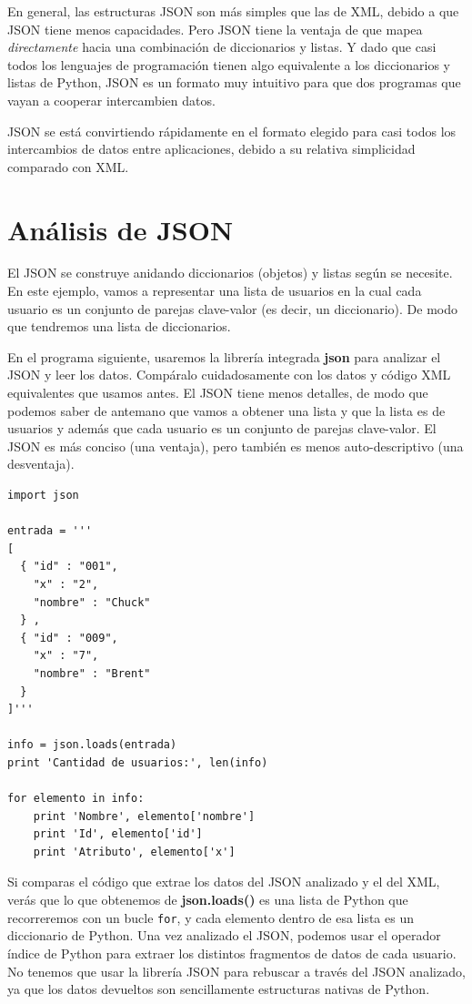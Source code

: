 En general, las estructuras JSON son más simples que las de XML, debido a que JSON tiene
menos capacidades. Pero JSON tiene la ventaja de que mapea {\em directamente} hacia una
combinación de diccionarios y listas. Y dado que casi todos los lenguajes de programación
tienen algo equivalente a los diccionarios y listas de Python, JSON es un formato
muy intuitivo para que dos programas que vayan a cooperar intercambien datos.

JSON se está convirtiendo rápidamente en el formato elegido para casi todos los intercambios
de datos entre aplicaciones, debido a su relativa simplicidad comparado con XML.

\section{Análisis de JSON}

El JSON se construye anidando diccionarios (objetos) y listas según se necesite.
En este ejemplo, vamos a representar una lista de usuarios en la cual cada usuario es un
conjunto de parejas clave-valor (es decir, un diccionario). De modo que tendremos una lista
de diccionarios.

En el programa siguiente, usaremos la librería integrada {\bf json} para analizar
el JSON y leer los datos. Compáralo cuidadosamente con los datos y código XML
equivalentes que usamos antes. El JSON tiene menos detalles, de modo que podemos saber de
antemano que vamos a obtener una lista y que la lista es de usuarios y además que cada usuario es un
conjunto de parejas clave-valor. El JSON es más conciso (una ventaja), pero también es
menos auto-descriptivo (una desventaja).

\beforeverb
\begin{verbatim}
import json

entrada = '''
[
  { "id" : "001",
    "x" : "2",
    "nombre" : "Chuck"
  } ,
  { "id" : "009",
    "x" : "7",
    "nombre" : "Brent"
  } 
]'''

info = json.loads(entrada)
print 'Cantidad de usuarios:', len(info)

for elemento in info:
    print 'Nombre', elemento['nombre']
    print 'Id', elemento['id']
    print 'Atributo', elemento['x']
\end{verbatim}
\afterverb
%
Si comparas el código que extrae los datos del JSON analizado y el del XML,
verás que lo que obtenemos de {\bf json.loads()} es una lista de Python
que recorreremos con un bucle {\tt for}, y cada elemento dentro de esa lista
es un diccionario de Python. Una vez analizado el JSON, podemos usar el operador
índice de Python para extraer los distintos fragmentos de datos de cada usuario. No
tenemos que usar la librería JSON para rebuscar a través del JSON analizado, ya que los
datos devueltos son sencillamente estructuras nativas de Python.

